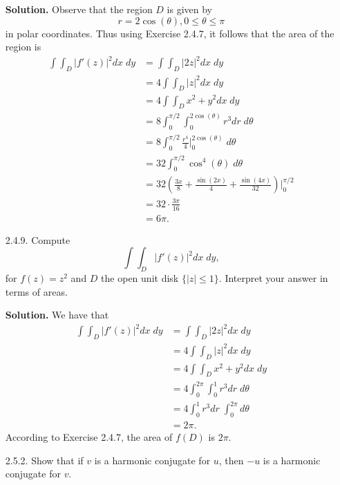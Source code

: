 \documentclass[9pt]{article}
\begin{document}
\begin{enumerate}
      \textbf{Solution.} Observe that the region $D$ is given by
      $$r = 2 \cos(\theta), 0 \le \theta \le \pi$$
      in polar coordinates. Thus using Exercise 2.4.7, it follows that the area
      of the region is
      \begin{align*}
         \int\int_D|f'(z)|^2dx\;dy &= \int\int_D|2z|^2dx\;dy \\
            &= 4\int\int_D|z|^2dx\;dy \\
            &= 4\int\int_D x^2 + y^2 dx\;dy  \\
            &= 8\int_0^{\pi/2}\int_0^{2\cos(\theta)} r^3 dr\;d\theta  \\
            &= 8\int_0^{\pi/2} \frac{r^4}{4} \bigg|_0^{2\cos(\theta)}\;d\theta  \\
            &= 32\int_0^{\pi/2} \cos^4(\theta)\;d\theta  \\
            &= 32\left(\frac{3x}{8}+ \frac{\sin(2x)}{4}+\frac{\sin(4x)}{32}\right)\bigg|_0^{\pi/2} \\
            &= 32 \cdot \frac{3\pi}{16} \\
            &= 6\pi.
      \end{align*} 
      
   \item[2.4.9.]  Compute
                  $$\int\int_D|f'(z)|^2dx\;dy,$$
                  for $f(z) = z^2$ and $D$ the open unit disk $\{|z| \le 1\}$.
                  Interpret your answer in terms of areas.
                  
      \textbf{Solution.} We have that
      \begin{align*}
         \int\int_D|f'(z)|^2dx\;dy &= \int\int_D|2z|^2dx\;dy \\
            &= 4\int\int_D|z|^2dx\;dy \\
            &= 4\int\int_D x^2 + y^2 dx\;dy  \\
            &= 4\int_0^{2\pi}\int_0^1 r^3 dr\;d\theta  \\
            &= 4\int_0^1 r^3 dr\;\int_0^{2\pi}d\theta  \\
            &= 2\pi.
      \end{align*}
      According to Exercise 2.4.7, the area of $f(D)$ is $2\pi$. 
   \item[2.5.2.]  Show that if $v$ is a harmonic conjugate for $u$, then $-u$ is
                  a harmonic conjugate for $v$.
                  

\end{enumerate}
\end{document}
